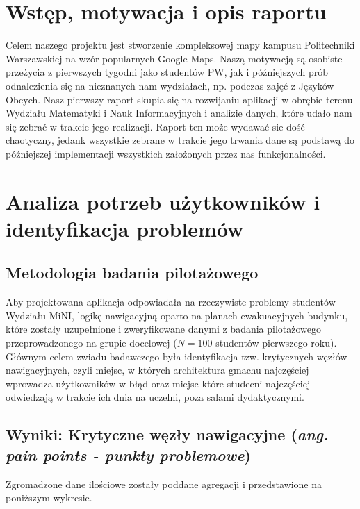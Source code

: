 \documentclass[14pt,a4paper]{extarticle}
\begin{document}
\section{Wstęp, motywacja i opis raportu}

Celem naszego projektu jest stworzenie kompleksowej mapy kampusu Politechniki Warszawskiej na wzór popularnych Google Maps. Naszą motywacją są osobiste przeżycia z pierwszych tygodni jako studentów PW, jak i późniejszych prób odnalezienia się na nieznanych nam wydziałach, np. podczas zajęć z Języków Obcych. Nasz pierwszy raport skupia się na rozwijaniu aplikacji w obrębie terenu Wydziału Matematyki i Nauk Informacyjnych i analizie danych, które udało nam się zebrać w trakcie jego realizacji. Raport ten może wydawać sie dość chaotyczny, jedank wszystkie zebrane w trakcie jego trwania dane są podstawą do późniejszej implementacji wszystkich założonych przez nas funkcjonalności.

\section{Analiza potrzeb użytkowników i identyfikacja problemów}

\subsection{Metodologia badania pilotażowego}

Aby projektowana aplikacja odpowiadała na rzeczywiste problemy studentów Wydziału MiNI, logikę nawigacyjną oparto na planach ewakuacyjnych budynku, które zostały uzupełnione i zweryfikowane danymi z badania pilotażowego przeprowadzonego na grupie docelowej ($N = 100$ studentów pierwszego roku). Głównym celem zwiadu badawczego była identyfikacja tzw. krytycznych węzłów nawigacyjnych, czyli miejsc, w których architektura gmachu najczęściej wprowadza użytkowników w błąd oraz miejsc które studecni najczęściej odwiedzają w trakcie ich dnia na uczelni, poza salami dydaktycznymi.

\subsection{Wyniki: Krytyczne węzły nawigacyjne (\textit{ang. pain points - punkty problemowe})}

Zgromadzone dane ilościowe zostały poddane agregacji i przedstawione na poniższym wykresie.
\end{document}
